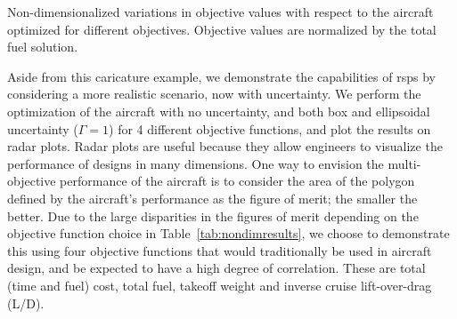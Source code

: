 \begin{table}
\caption{Non-dimensionalized variations in objective values with respect to the aircraft optimized
for different objectives. Objective values are normalized by the total fuel solution.}
    \label{tab:nondimresults}
\end{table}

Aside from this caricature example, we demonstrate the capabilities of \gls{rsp}s
by considering a more realistic scenario, now with uncertainty.
We perform the optimization of the aircraft with no uncertainty, and both box and
ellipsoidal uncertainty ($\Gamma = 1$)
for 4 different objective functions, and plot the results on radar plots.
Radar plots are useful because they allow engineers to visualize the performance
of designs in many dimensions. One way to envision the multi-objective
performance of the aircraft is to consider the area of the polygon defined by the aircraft's
performance as the figure of merit; the smaller the better.
Due to the large disparities in the figures of merit depending on the objective function choice
in Table~\ref{tab:nondimresults}, we choose to demonstrate this using four objective functions
that would traditionally be used in aircraft design, and be expected to have a high degree of correlation.
These are total (time and fuel) cost, total fuel, takeoff weight and inverse cruise lift-over-drag (L/D).

